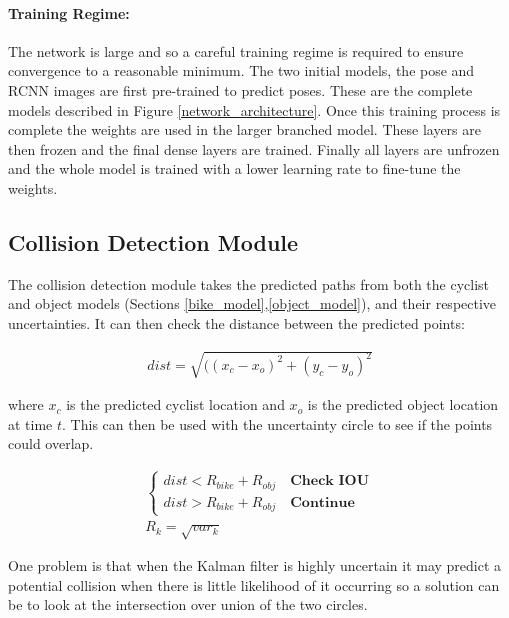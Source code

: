 \documentclass[11pt,twoside]{report}
\begin{document}
\paragraph{Training Regime:}The network is large and so a careful training regime is required to ensure convergence to a reasonable minimum. The two initial models, the pose and RCNN images are first pre-trained to predict poses. These are the complete models described in Figure \ref{network_architecture}. Once this training process is complete the weights are used in the larger branched model. These layers are then frozen and the final dense layers are trained. Finally all layers are unfrozen and the whole model is trained with a lower learning rate to fine-tune the weights.

\subsection{Collision Detection Module}
The collision detection module takes the predicted paths from both the cyclist and object models (Sections \ref{bike_model},\ref{object_model}), and their respective uncertainties. It can then check the distance between the predicted points:

\begin{equation}
\begin{aligned}
dist = \sqrt{( (x_{c}-x_{o})^{2} + (y_{c}-y_{o})^{2}}
\end{aligned}
\label{distance_eq}
\end{equation}

where $x_{c}$ is the predicted cyclist location and $x_{o}$ is the predicted object location at time $t$. This can then be used with the uncertainty circle to see if the points could overlap.

\begin{equation}
\begin{aligned}
\begin{cases}
dist < R_{bike} + R_{obj} \quad \textbf{Check IOU} \\
dist > R_{bike} + R_{obj} \quad \textbf{Continue}
\end{cases} \\
R_{k} = \sqrt{var_{k}}
\end{aligned}
\label{horn_eq}
\end{equation}


One problem is that when the Kalman filter is highly uncertain it may predict a potential collision when there is little likelihood of it occurring so a solution can be to look at the intersection over union of the two circles.
\end{document}
